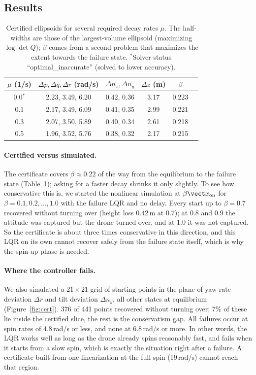\subsection{Results}
\begin{table}[h]
\centering\small
\caption{Certified ellipsoids for several required decay rates $\mu$. The half-widths are those of the largest-volume ellipsoid (maximizing $\log\det Q$); $\beta$ comes from a second problem that maximizes the extent towards the failure state. $^{*}$Solver status ``optimal\_inaccurate'' (solved to lower accuracy).}\label{tab:cert}
\begin{tabular}{cccccc}
\toprule
$\mu$ (1/s) & $\Delta p, \Delta q, \Delta r$ (rad/s) & $\Delta n_x, \Delta n_y$ & $\Delta z$ (m) & $\beta$ \\
\midrule
0.0$^{*}$ & 2.23, 3.49, 6.20 & 0.42, 0.36 & 3.17 & 0.223 \\
0.1 & 2.17, 3.49, 6.09 & 0.41, 0.35 & 2.99 & 0.221 \\
0.3 & 2.07, 3.50, 5.89 & 0.40, 0.34 & 2.61 & 0.218 \\
0.5 & 1.96, 3.52, 5.76 & 0.38, 0.32 & 2.17 & 0.215 \\
\bottomrule
\end{tabular}
\end{table}

\paragraph{Certified versus simulated.} The certificate covers $\beta\approx0.22$ of the way from the equilibrium to the failure state (Table~\ref{tab:cert}); asking for a faster decay shrinks it only slightly. To see how conservative this is, we started the nonlinear simulation at $\beta\vect x_{\text{on}}$ for $\beta = 0.1, 0.2, \dots, 1.0$ with the failure LQR and no delay. Every start up to $\beta = 0.7$ recovered without turning over (height loss 0.42\,m at 0.7); at 0.8 and 0.9 the attitude was captured but the drone turned over, and at 1.0 it was not captured. So the certificate is about three times conservative in this direction, and this LQR on its own cannot recover safely from the failure state itself, which is why the spin-up phase is needed.

\paragraph{Where the controller fails.} We also simulated a $21\times21$ grid of starting points in the plane of yaw-rate deviation $\Delta r$ and tilt deviation $\Delta n_y$, all other states at equilibrium (Figure~\ref{fig:cert}). 376 of 441 points recovered without turning over; 7\% of these lie inside the certified slice, the rest is the conservatism gap. All failures occur at spin rates of 4.8\,rad/s or less, and none at 6.8\,rad/s or more. In other words, the LQR works well as long as the drone already spins reasonably fast, and fails when it starts from a slow spin, which is exactly the situation right after a failure. A certificate built from one linearization at the full spin (19\,rad/s) cannot reach that region.

